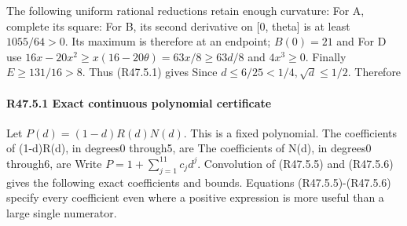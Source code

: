 The following uniform rational reductions retain enough curvature:
For A, complete its square:
For B, its second derivative on [0, theta] is at least \(1055/64>0.\)
Its maximum is therefore at an endpoint; \(B(0)=21\) and
For D use
\(16x-20x^2\ge x(16-20\theta)=63x/8\ge 63d/8\) and \(4x^3\ge 0.\)
Finally \(E\ge 131/16>8.\) Thus (R47.5.1) gives
Since \(d\le 6/25<1/4,\allowbreak  \sqrt{d}\le 1/2.\) Therefore

\paragraph{R47.5.1 Exact continuous polynomial certificate}

Let \(P(d)=(1-d)R(d)N(d).\) This is a fixed polynomial. The coefficients of (1-d)R(d), in degrees0 through5, are
The coefficients of N(d), in degrees0 through6, are
Write \(P=1+\sum_{j=1}^{11}c_j d^j.\) Convolution of (R47.5.5) and (R47.5.6)
gives the following exact coefficients and bounds. Equations (R47.5.5)-(R47.5.6) specify every
coefficient even where a positive expression is more useful than a large
single numerator.



